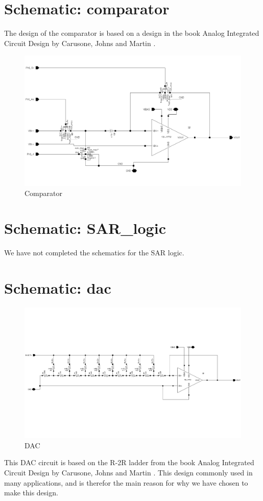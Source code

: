 \documentclass[english, a4paper,11pt]{article}
\begin{document}
\section*{Schematic: comparator}
The design of the comparator is based on a design in the book Analog Integrated Circuit Design by Carusone, Johns and Martin \cite{carusone}. 
\begin{figure}[!ht]
 \centering
   \includegraphics[width=\textwidth]{img/comparator}
   \caption{Comparator}
   \label{comparator}
\end{figure}


\section*{Schematic: SAR\_logic}
We have not completed the schematics for the SAR logic.

\section*{Schematic: dac}
\begin{figure}[!ht]
 \centering
   \includegraphics[width=\textwidth]{img/dac}
   \caption{DAC}
   \label{dac}
\end{figure}
This DAC circuit is based on the R-2R ladder from the book Analog Integrated Circuit Design by Carusone, Johns and Martin \cite{carusone}. This design commonly used in many applications, and
is therefor the main reason for why we have chosen to make this design.
\end{document}
